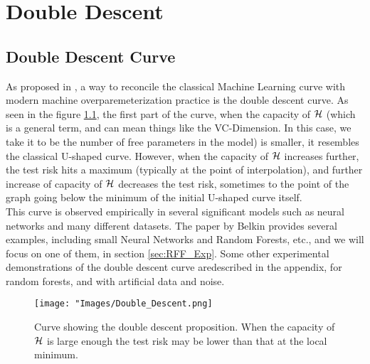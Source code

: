 \documentclass[twoside]{memoir}
\begin{document}
\chapter{Double Descent}

\section{Double Descent Curve}
As proposed in \cite{Belkin_2019}, a way to reconcile the classical Machine Learning curve with modern machine overparemeterization practice is the double descent curve. As seen in the figure \ref{fig:Double_Descent}, the first part of the curve, when the capacity of $\mathcal{H}$ (which is a general term, and can mean things like the VC-Dimension. In this case, we take it to be the number of free parameters in the model) is smaller, it resembles the classical U-shaped curve. However, when the capacity of $\mathcal{H}$ increases further, the test risk hits a maximum (typically at the point of interpolation), and further increase of capacity of $\mathcal{H}$ decreases the test risk, sometimes to the point of the graph going below the minimum of the initial U-shaped curve itself. \\
This curve is observed empirically in several significant models such as neural networks and many different datasets. The paper by Belkin  provides several examples, including small Neural Networks and Random Forests, etc., and we will focus on one of them, in section \ref{sec:RFF_Exp}. Some other experimental demonstrations of the double descent curve aredescribed in the appendix, for random forests, and with artificial data and noise.

\begin{figure}
	\centering
	\texttt{[image: "Images/Double\_Descent.png]}
	\par
	\caption{Curve showing the double descent proposition. When the capacity of $\mathcal{H}$ is large enough the test risk may be lower than that at the local minimum.} \label{fig:Double_Descent}
\end{figure}

\pagebreak
\end{document}
